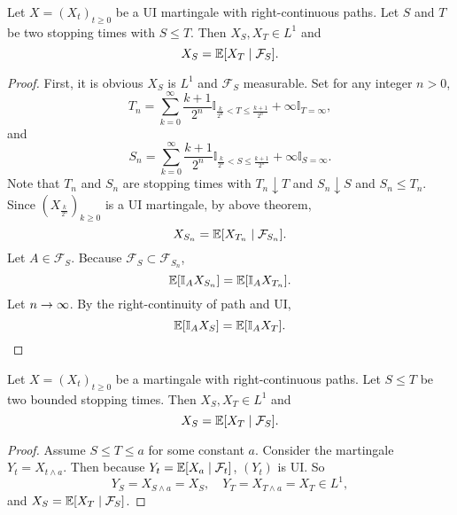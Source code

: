 \begin{thm}
    Let $X=(X_t)_{t \geq 0}$ be a UI martingale with right-continuous paths. Let $S$ and $T$ be two stopping times with $S \leq T$. Then $X_S,X_T \in L^1$ and
    \begin{equation*}
        X_S= \mathbb{E}[X_T \mid \mathcal{F}_S].
    \end{equation*}
\end{thm}
\begin{proof}
    First, it is obvious $X_S$ is $L^1$ and $\mathcal{F}_S$ measurable. Set for any integer $n > 0$,
    \begin{equation*}
        T_n = \sum_{k=0}^\infty \frac{k+1}{2^n}\mathbb{I}_{\frac{k}{2^n} < T \leq \frac{k+1}{2^n}} + \infty \mathbb{I}_{T = \infty},
    \end{equation*}
    and
    \begin{equation*}
        S_n = \sum_{k=0}^\infty \frac{k+1}{2^n}\mathbb{I}_{\frac{k}{2^n} < S \leq \frac{k+1}{2^n}} + \infty \mathbb{I}_{S = \infty}.
    \end{equation*}
    Note that $T_n$ and $S_n$ are stopping times with $T_n \downarrow T$ and $S_n \downarrow S$ and $S_n \leq T_n$. Since $(X_{\frac{k}{2^n}})_{k \geq 0}$ is a UI martingale, by above theorem,
    \begin{equation*}
        X_{S_n} = \mathbb{E}[X_{T_n} \mid \mathcal{F}_{S_n}].
    \end{equation*}
    Let $A \in \mathcal{F}_S$. Because $\mathcal{F}_{S} \subset \mathcal{F}_{S_n}$,
    \begin{equation*}
        \mathbb{E}[\mathbb{I}_A X_{S_n}] = \mathbb{E}[\mathbb{I}_A X_{T_n}].
    \end{equation*}
    Let $n \rightarrow \infty$. By the right-continuity of path and UI,
    \begin{equation*}
        \mathbb{E}[\mathbb{I}_A X_{S}] = \mathbb{E}[\mathbb{I}_A X_{T}]. \qedhere
    \end{equation*}
\end{proof}

\begin{cor}
    Let $X = (X_t)_{t \geq 0}$ be a martingale with right-continuous paths. Let $S \leq T$ be two bounded stopping times. Then $X_S,X_T \in L^1$ and
    \begin{equation*}
        X_S = \mathbb{E}[X_T \mid \mathcal{F}_S].
    \end{equation*}
\end{cor}
\begin{proof}
    Assume $S \leq T \leq a$ for some constant $a$. Consider the martingale $Y_t = X_{t \wedge a}$. Then because $Y_t = \mathbb{E}[X_a \mid \mathcal{F}_t]$, $(Y_t)$ is UI. So
    \begin{equation*}
        Y_S = X_{S \wedge a} = X_S,\quad Y_T = X_{T \wedge a} = X_T \in L^1,
    \end{equation*}
    and $X_S = \mathbb{E}[X_T \mid \mathcal{F}_S]$.
\end{proof}

